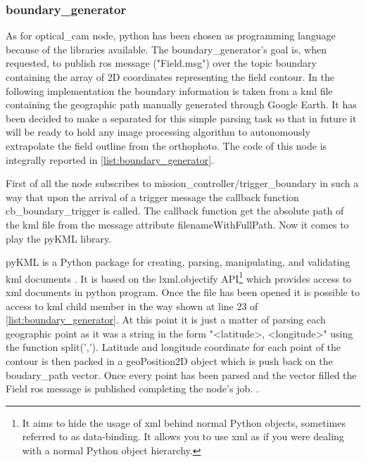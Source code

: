 \subsubsection{boundary\_generator} %
\label{ssub:boundary_generator}
As for \textsf{optical\_cam} node, python has been chosen as programming language because of the libraries available.
The \textsf{boundary\_generator}'s goal is, when requested, to publish \acrshort{ros} message ("Field.msg") over the topic \textsf{boundary} containing the array of 2D coordinates representing the field contour.
In the following implementation the boundary information is taken from a \acrshort{kml} file containing the geographic path manually generated through Google Earth. It has been decided to make a separated for this simple parsing task so that in future it will be ready to hold any image processing algorithm to autonomously extrapolate the field outline from the orthophoto.
The code of this node is integrally reported in \autoref{list:boundary_generator}.\par
First of all the node subscribes to \textsf{mission\_controller/trigger\_boundary} in such a way that upon the arrival of a trigger message the callback function \textsf{cb\_boundary\_trigger} is called. The callback function get the absolute path of the \acrshort{kml} file from the message attribute \textsf{filenameWithFullPath}. Now it comes to play the pyKML library.\par
pyKML is a Python package for creating, parsing, manipulating, and validating \acrshort{kml} documents \cite{pyKML}. It is based on the \textsf{lxml.objectify} API\footnote{It aims to hide the usage of \acrshort{xml} behind normal Python objects, sometimes referred to as data-binding. It allows you to use \acrshort{xml} as if you were dealing with a normal Python object hierarchy.\cite{lxml}} which provides access to \acrshort{xml} documents in python program. Once the file has been opened it is possible to access to \acrshort{kml} child member in the way shown at line 23 of \autoref{list:boundary_generator}. At this point it is just a matter of parsing each geographic point as it was a string in the form "<latitude>, <longitude>" using the function \textsf{split(',')}.
Latitude and longitude coordinate for each point of the contour is then packed in a \textsf{geoPosition2D} object which is push back on the \textsf{boudary\_path} vector. Once every point has been parsed and the vector filled the \textsf{Field} \acrshort{ros} message is published completing the node's job.
.

